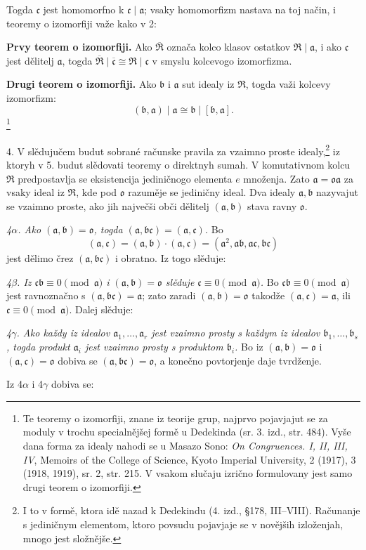 \documentclass[11pt]{article}
\providecommand{\mR}{\mathfrak{R}}
\providecommand{\ma}{\mathfrak{a}}
\providecommand{\mb}{\mathfrak{b}}
\providecommand{\mc}{\mathfrak{c}}
\providecommand{\mo}{\mathfrak{o}}
\begin{document}
Togda $\mc$ jest homomorfno k $\mc\mid\ma$; vsaky homomorfizm nastava na toj način, i teoremy o izomorfiji važe kako v 2:

\textbf{Prvy teorem o izomorfiji.} Ako $\overline{\mR}$ označa kolco klasov ostatkov $\mR\mid\ma$, i ako $\mc$ jest dělitelj $\ma$, togda $\overline{\mR}\mid\overline{\mc}\cong\mR\mid\mc$ v smyslu kolcevogo izomorfizma.

\textbf{Drugi teorem o izomorfiji.} Ako $\mb$ i $\ma$ sut idealy iz $\mR$, togda važi kolcevy izomorfizm:
\[
(\mb,\ma)\mid\ma\cong\mb\mid[\mb,\ma].
\]\footnote{Te teoremy o izomorfiji, znane iz teorije grup, najprvo pojavjajut se za moduly v trochu specialnějšej formě u Dedekinda (sr. 3. izd., str. 484). Vyše dana forma za idealy nahodi se u Masazo Sono: \emph{On Congruences. I, II, III, IV}, Memoirs of the College of Science, Kyoto Imperial University, 2 (1917), 3 (1918, 1919), sr. 2, str. 215. V vsakom slučaju izrično formulovany jest samo drugi teorem o izomorfiji.}

4. V slědujučem budut sobrané računske pravila za vzaimno proste idealy,\footnote{I to v formě, ktora idě nazad k Dedekindu (4. izd., §178, III--VIII). Računanje s jediničnym elementom, ktoro povsudu pojavjaje se v novějših izloženjah, mnogo jest složnějše.} iz ktoryh v 5. budut slědovati teoremy o direktnyh sumah. V komutativnom kolcu $\mR$ predpostavlja se eksistencija jediničnogo elementa $e$ množenja. Zato $\ma=\mo\ma$ za vsaky ideal iz $\mR$, kde pod $\mo$ razuměje se jediničny ideal. Dva idealy $\ma,\mb$ nazyvajut se vzaimno proste, ako jih največši obči dělitelj $(\ma,\mb)$ stava ravny $\mo$.

\emph{4$\alpha$. Ako $(\ma,\mb)=\mo$, togda $(\ma,\mb\mc)=(\ma,\mc)$.} Bo
\[
(\ma,\mc)=(\ma,\mb)\cdot(\ma,\mc)=(\ma^2,\ma\mb,\ma\mc,\mb\mc)
\]
jest dělimo črez $(\ma,\mb\mc)$ i obratno. Iz togo slěduje:

\emph{4$\beta$. Iz $\mc\mb\equiv0\pmod{\ma}$ i $(\ma,\mb)=\mo$ slěduje $\mc\equiv0\pmod{\ma}$.} Bo $\mc\mb\equiv0\pmod{\ma}$ jest ravnoznačno s $(\ma,\mb\mc)=\ma$; zato zaradi $(\ma,\mb)=\mo$ takodže $(\ma,\mc)=\ma$, ili $\mc\equiv0\pmod{\ma}$. Dalej slěduje:

\emph{4$\gamma$. Ako každy iz idealov $\ma_1,\ldots,\ma_r$ jest vzaimno prosty s každym iz idealov $\mb_1,\ldots,\mb_s$, togda produkt $\ma_i$ jest vzaimno prosty s produktom $\mb_i$.} Bo iz $(\ma,\mb)=\mo$ i $(\ma,\mc)=\mo$ dobiva se $(\ma,\mb\mc)=\mo$, a konečno povtorjenje daje tvrdženje.

Iz 4$\alpha$ i 4$\gamma$ dobiva se:
\end{document}
